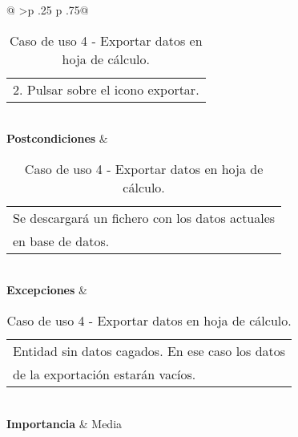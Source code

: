 \begin{table}[h]
\begin{tabular}{@{}
			>{}p {.25\textwidth} p {.75\textwidth}@{}}
\begin{tabular}[c]{@{}l@{}}
										2. Pulsar sobre el icono exportar.
									\end{tabular} \\ \midrule
		\textbf{Postcondiciones} &  \begin{tabular}[c]{@{}l@{}}
										Se descargará un fichero con los datos actuales \\
										en base de datos.
									\end{tabular} \\ \midrule
		\textbf{Excepciones}     &  \begin{tabular}[c]{@{}l@{}}
										Entidad sin datos cagados. En ese caso los datos \\
										de la exportación estarán vacíos.\\ 
									\end{tabular} \\ \midrule
		\textbf{Importancia}     &  Media \\ \bottomrule
	\end{tabular}
	\caption{Caso de uso 4 - Exportar datos en hoja de cálculo.}
\end{table}



